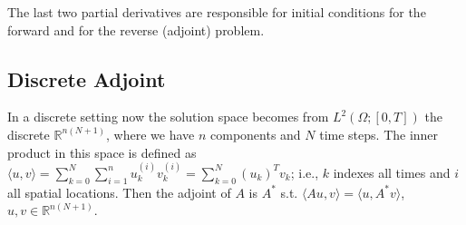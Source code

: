 \documentclass[10pt]{article}
\begin{document}
{The last two partial derivatives are responsible for initial conditions for the forward and for the reverse (adjoint) problem.

\subsection{Discrete Adjoint \label{sec:adj:discrete}} 

In a discrete setting now the solution space becomes from $L^2(\Omega;[0,T])$ the discrete $\mathbb{R}^{n(N+1)}$, where we have $n$ components and $N$ time
steps. The inner product in this space is defined as $\langle u , v
\rangle = \sum_{k=0}^N \sum_{i=1}^{n} u_k^{(i)} v_k^{(i)} =
\sum_{k=0}^N  (u_k)^T v_k$; i.e., $k$ indexes all times and $i$ all
spatial locations. Then the adjoint of $A$ is $A^*$ s.t. $\langle A u , v
\rangle = \langle u , A^* v \rangle $, $u,v \in \mathbb{R}^{n(N+1)}$.

}
\end{document}
